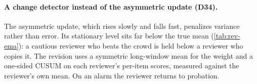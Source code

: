\begin{table}[t]
\centering\small
\caption{Rank correlation between reviewers' mean leave-one-out scores over $k$ scored items and
their true skill (panels of nine, 300 replications). Source:
\texttt{scripts/revisions\_evaluator.py}.}
\label{tab:rev-learning}
\end{table}

\paragraph{A change detector instead of the asymmetric update (D34).} The asymmetric update, which
rises slowly and falls fast, penalizes variance rather than error. Its stationary level sits far
below the true mean (\cref{tab:rev-ema}): a cautious reviewer who beats the crowd is held below a
reviewer who copies it. The revision uses a symmetric long-window mean for the weight and a
one-sided CUSUM on each reviewer's per-item scores, measured against the reviewer's own mean. On
an alarm the reviewer returns to probation.

